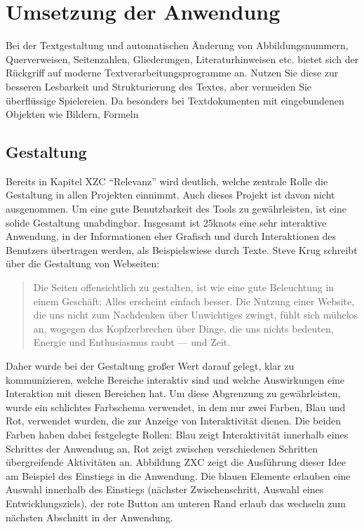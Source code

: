 \chapter{Umsetzung der Anwendung}
\thispagestyle{fancy}
Bei der Textgestaltung und automatischen Änderung von Abbildungsnummern, Querverweisen,
Seitenzahlen, Gliederungen, Literaturhinweisen etc. bietet sich der Rückgriff
auf moderne Textverarbeitungsprogramme an. Nutzen Sie diese zur besseren Lesbarkeit
und Strukturierung des Textes, aber vermeiden Sie überflüssige Spielereien. Da
besonders bei Textdokumenten mit eingebundenen Objekten wie Bildern, Formeln

\section{Gestaltung}
Bereits in Kapitel XZC “Relevanz” wird deutlich, welche zentrale Rolle die Gestaltung in allen Projekten einnimmt. Auch dieses Projekt ist davon nicht ausgenommen. Um eine gute Benutzbarkeit des Tools zu gewährleisten, ist eine solide Gestaltung unabdingbar.
Insgesamt ist 25knots eine sehr interaktive Anwendung, in der Informationen eher Grafisch und durch Interaktionen des Benutzers übertragen werden, als Beispielswiese durch Texte. Steve Krug schreibt über die Gestaltung von Webseiten:

\begin{quote}
  Die Seiten offensichtlich zu gestalten, ist wie eine gute Beleuchtung in einem Geschäft: Alles erscheint einfach besser. Die Nutzung einer Website, die uns nicht zum Nachdenken über Unwichtiges zwingt, fühlt sich mühelos an, wogegen das Kopfzerbrechen über Dinge, die uns nichts bedeuten, Energie und Enthusiasmus raubt — und Zeit. \cite[S. 19]{Krug201410}
\end{quote}

Daher wurde bei der Gestaltung großer Wert darauf gelegt, klar zu kommunizieren, welche Bereiche interaktiv sind und welche Auswirkungen eine Interaktion mit diesen Bereichen hat.
Um diese Abgrenzung zu gewährleisten, wurde ein schlichtes Farbschema verwendet, in dem nur zwei Farben, Blau und Rot, verwendet wurden, die zur Anzeige von Interaktivität dienen.
Die beiden Farben haben dabei festgelegte Rollen: Blau zeigt Interaktivität innerhalb eines Schrittes der Anwendung an, Rot zeigt zwischen verschiedenen Schritten übergreifende Aktivitäten an. Abbildung ZXC zeigt die Ausführung dieser Idee am Beispiel des Einstiegs in die Anwendung. Die blauen Elemente erlauben eine Auswahl innerhalb des Einstiegs (nächster Zwischenschritt, Auswahl eines Entwicklungsziels), der rote Button am unteren Rand erlaub das wechseln zum nächsten Abschnitt in der Anwendung.

